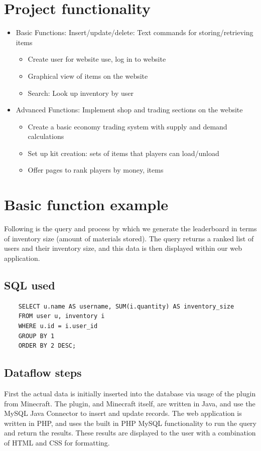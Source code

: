 \documentclass[12pt]{article}
\begin{document}
\section{Project functionality}
\begin{itemize}
  \item Basic Functions: Insert/update/delete: Text commands for storing/retrieving items
  \begin{itemize}
    \item Create user for website use, log in to website
    \item Graphical view of items on the website
    \item Search: Look up inventory by user
  \end{itemize}
  \item Advanced Functions: Implement shop and trading sections on the website
  \begin{itemize}
    \item Create a basic economy trading system with supply and demand calculations
    \item Set up kit creation: sets of items that players can load/unload
    \item Offer pages to rank players by money, items
  \end{itemize}
\end{itemize}

\section{Basic function example}
Following is the query and process by which we generate the leaderboard in terms of inventory size (amount of materials stored). The query returns a ranked list of users and their inventory size, and this data is then displayed within our web application.

\subsection{SQL used}
  \begin{lstlisting}
    SELECT u.name AS username, SUM(i.quantity) AS inventory_size
    FROM user u, inventory i
    WHERE u.id = i.user_id
    GROUP BY 1
    ORDER BY 2 DESC;
  \end{lstlisting}

\subsection{Dataflow steps}
First the actual data is initially inserted into the database via usage of the plugin from Minecraft. The plugin, and Minecraft itself, are written in Java, and use the MySQL Java Connector to insert and update records. The web application is written in PHP, and uses the built in PHP MySQL functionality to run the query and return the results. These results are displayed to the user with a combination of HTML and CSS for formatting.
\end{document}
